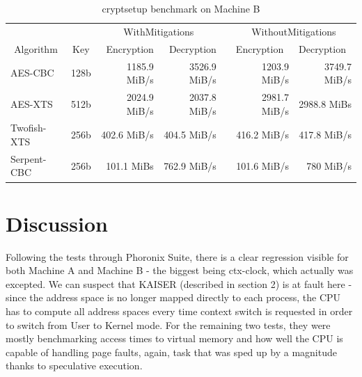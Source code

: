 \documentclass{csfourzero}
\begin{document}
\begin{table}[h]
\centering
\begin{tabular}{@{}lcrrrrr@{}}
\multicolumn{1}{c}{}          & \multicolumn{1}{l}{} & \multicolumn{2}{c}{WithMitigations}           & \multicolumn{1}{l}{} & \multicolumn{2}{c}{WithoutMitigations}                          \\ \cmidrule(r){1-4} \cmidrule(l){6-7} 
\multicolumn{1}{c}{Algorithm} & Key                  & Encryption   & \multicolumn{1}{r}{Decryption} & \multicolumn{1}{r}{} & \multicolumn{1}{l}{Encryption} & \multicolumn{1}{l}{Decryption} \\ \cmidrule(r){1-4} \cmidrule(l){6-7} 
AES-CBC                       & 128b                 & 1185.9 MiB/s & 3526.9 MiB/s                   &                      & 1203.9 MiB/s                   & 3749.7 MiB/s                   \\
AES-XTS                       & 512b                 & 2024.9 MiB/s & 2037.8 MiB/s                   &                      & 2981.7 MiB/s                   & 2988.8 MiBs                    \\
Twofish-XTS                   & 256b                 & 402.6 MiB/s  & 404.5 MiB/s                    &                      & 416.2 MiB/s                    & 417.8 MiB/s                    \\
Serpent-CBC                   & 256b                 & 101.1 MiBs   & 762.9 MiB/s                    &                      & 101.6 MiB/s                    & 780 MiB/s                      \\ \cmidrule(r){1-4} \cmidrule(l){6-7} 
\end{tabular}
\caption{cryptsetup benchmark on Machine B}
\label{tab:cryptoB}
\end{table}


\section{Discussion}
\label{sec:discuss}

Following the tests through Phoronix Suite, there is a clear regression visible for both Machine A and Machine B - the biggest being ctx-clock, which actually was excepted. We can suspect that KAISER (described in section 2) is at fault here - since the address space is no longer mapped directly to each process, the CPU has to compute all address spaces every time context switch is requested in order to switch from User to Kernel mode. For the remaining two tests, they were mostly benchmarking access times to virtual memory and how well the CPU is capable of handling page faults, again, task that was sped up by a magnitude thanks to speculative execution.
\end{document}
